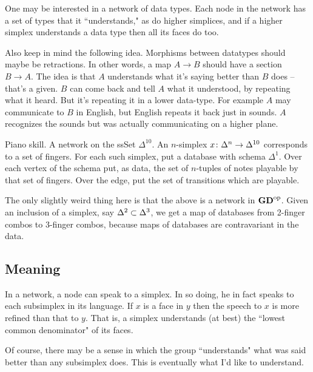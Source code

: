 \documentclass{amsart}
\def\GD{{\bf GD}}
\begin{document}
\begin{example}

One may be interested in a network of data types.  Each node in the network has a set of types that it ``understands," as do higher simplices, and if a higher simplex understands a data type then all its faces do too.  

Also keep in mind the following idea.  Morphisms between datatypes should maybe be retractions.  In other words, a map $A\to B$ should have a section $B\to A$.  The idea is that $A$ understands what it's saying better than $B$ does -- that's a given.  $B$ can come back and tell $A$ what it understood, by repeating what it heard.  But it's repeating it in a lower data-type.  For example $A$ may communicate to $B$ in English, but English repeats it back just in sounds.  $A$ recognizes the sounds but was actually communicating on a higher plane.

\end{example}

\begin{example}

Piano skill.  A network on the ssSet $\Delta^{10}$.  An $n$-simplex $x\taking\Delta^n\to\Delta^{10}$ corresponds to a set of fingers.  For each such simplex, put a database with schema $\Delta^1$.  Over each vertex of the schema put, as data, the set of $n$-tuples of notes playable by that set of fingers.  Over the edge, put the set of transitions which are playable.  

The only slightly weird thing here is that the above is a network in $\GD\op$.  Given an inclusion of a simplex, say $\Delta^2\ss\Delta^3$, we get a map of databases from 2-finger combos to 3-finger combos, because maps of databases are contravariant in the data.

\end{example}

\subsection{Meaning}

In a network, a node can speak to a simplex. In so doing, he in fact speaks to each subsimplex in its language.  If $x$ is a face in $y$ then the speech to $x$ is more refined than that to $y$.  That is, a simplex understands (at best) the ``lowest common denominator" of its faces.

Of course, there may be a sense in which the group ``understands" what was said better than any subsimplex does.  This is eventually what I'd like to understand.
\end{document}
